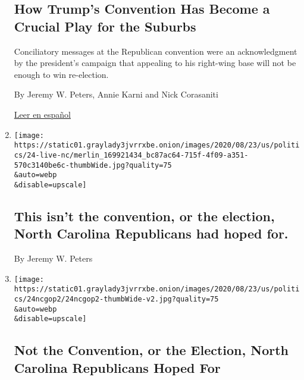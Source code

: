 \begin{enumerate}
{  \subsection{How Trump's Convention Has Become a Crucial Play for the
  Suburbs}\label{how-trumps-convention-has-become-a-crucial-play-for-the-suburbs-1}}

  Conciliatory messages at the Republican convention were an
  acknowledgment by the president's campaign that appealing to his
  right-wing base will not be enough to win re-election.

  By Jeremy W. Peters, Annie Karni and Nick Corasaniti

  \href{https://www.nytimes3xbfgragh.onion/es/2020/08/27/espanol/estados-unidos/trump-convencion-republicana.html}{Leer
  en español}
\item
  \href{/2020/08/24/us/elections/this-isnt-the-convention-or-the-election-north-carolina-republicans-had-hoped-for.html}{}

  \texttt{[image: https://static01.graylady3jvrrxbe.onion/images/2020/08/23/us/politics/24-live-nc/merlin\_169921434\_bc87ac64-715f-4f09-a351-570c3140be6c-thumbWide.jpg?quality=75\\\&auto=webp\\\&disable=upscale]}

  \hypertarget{this-isnt-the-convention-or-the-election-north-carolina-republicans-had-hoped-for}{%
  \subsection{This isn't the convention, or the election, North Carolina
  Republicans had hoped
  for.}\label{this-isnt-the-convention-or-the-election-north-carolina-republicans-had-hoped-for}}

  By Jeremy W. Peters
\item
  \href{/2020/08/24/us/politics/north-carolina-charlotte-rnc.html}{}

  \texttt{[image: https://static01.graylady3jvrrxbe.onion/images/2020/08/23/us/politics/24ncgop2/24ncgop2-thumbWide-v2.jpg?quality=75\\\&auto=webp\\\&disable=upscale]}

  \hypertarget{not-the-convention-or-the-election-north-carolina-republicans-hoped-for}{%
  \subsection{Not the Convention, or the Election, North Carolina
  Republicans Hoped
  For}\label{not-the-convention-or-the-election-north-carolina-republicans-hoped-for}}


\end{enumerate}
